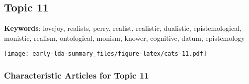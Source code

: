 \documentclass[
]{article}
\begin{document}
\newpage

\hypertarget{topic-11}{%
\subsection{Topic 11}\label{topic-11}}

\textbf{Keywords}: lovejoy, realists, perry, realist, realistic,
dualistic, epistemological, monistic, realism, ontological, monism,
knower, cognitive, datum, epistemology

\texttt{[image: early-lda-summary\_files/figure-latex/cats-11.pdf]}
\newpage 

\hypertarget{characteristic-articles-for-topic-11}{%
\subsubsection{Characteristic Articles for Topic
11}\label{characteristic-articles-for-topic-11}}
\end{document}
